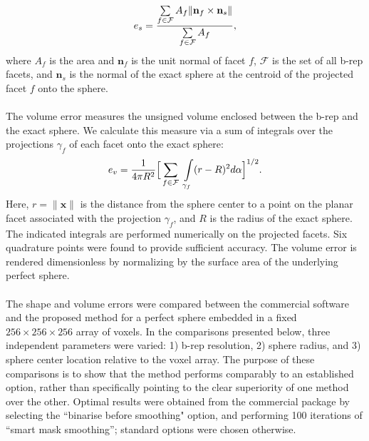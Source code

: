 \begin{equation} 
	e_s = \frac{ \sum \limits_{f\in\mathcal{F}} A_f \lVert {\bf n}_f \times {\bf n}_s \rVert}{\sum \limits_{f\in\mathcal{F}} A_f},
\end{equation}
where $A_f$ is the area and ${\bm n}_f$ is the unit normal of facet $f$, $\mathcal{F}$ is the set of all b-rep facets, and ${\bm n}_s$ is the normal of the exact sphere at the centroid of the projected facet $f$ onto the sphere. \\ \\
%
The volume error measures the unsigned volume enclosed between the b-rep and the exact sphere. We calculate this measure via a sum of integrals over the projections $\gamma_f$ of each facet onto the exact sphere: 
\begin{equation}
\label{vol err}
	e_v = \frac{1}{4\pi R^2} \Big[\sum \limits_{f \in \mathcal{F}\textsl{}} \ \int \limits_{\gamma_f} (r - R)^2 d\alpha \Big]^{1/2} .
\end{equation}
Here, $r = \lVert {\bm x} \rVert$ is the distance from the sphere center to a point on the planar facet associated with the projection $\gamma_f$, and $R$ is the radius of the exact sphere.  The indicated integrals are performed numerically on the projected facets. Six quadrature points were found to provide sufficient accuracy. The volume error is rendered dimensionless by normalizing by the surface area of the underlying perfect sphere.
\\ \\
%
The shape and volume errors were compared between the commercial software and the proposed method for a perfect sphere embedded in a fixed $256 \times 256 \times 256$ array of voxels.  In the comparisons presented below, three independent parameters were varied:  1) b-rep resolution, 2) sphere radius, and 3) sphere center location relative to the voxel array. The purpose of these comparisons is to show that the method performs comparably to an established option, rather than specifically pointing to the clear superiority of one method over the other. Optimal results were obtained from the commercial package by selecting the ``binarise before smoothing" option, and performing 100 iterations of ``smart mask smoothing''; standard options were chosen otherwise. \\ \\
%
